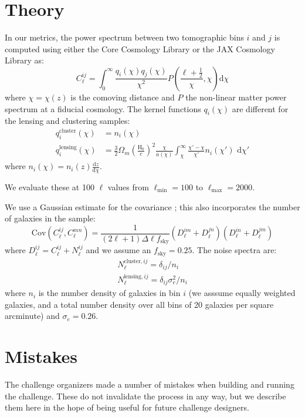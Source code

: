 \documentclass[twocolumn,twocolappendix]{aastex63}
\begin{document}
\section{Theory}\label{app:theory}
In our metrics, the power spectrum between two tomographic bins $i$ and $j$ is computed using either the Core Cosmology Library \citep{ccl} or the JAX Cosmology Library \citep{jax-cosmo} as:
\begin{equation}
    C^{ij}_\ell = \int_0^{\infty} \frac{q_i(\chi) q_j(\chi)}{\chi^2} P\left(\frac{\ell +\frac{1}{2}}{\chi}, \chi \right) \mathrm{d}\chi
\end{equation}
where $\chi = \chi(z)$ is the comoving distance and $P$ the non-linear matter power spectrum at
a fiducial cosmology.  The kernel functions $q_i(\chi)$ are different for the lensing and clustering samples:
\begin{align}
    q^{\mathrm{cluster}}_i(\chi) &= n_i(\chi)\\
    q^{\mathrm{lensing}}_i(\chi) &= \frac{3}{2}\Omega_m \left(\frac{\mathrm{H}_0}{c}\right)^2 \frac{\chi}{a(\chi)} \int_\chi^{\infty} \frac{\chi' - \chi}{\chi'} n_i(\chi')\,\,\mathrm{d}\chi'
\end{align}
where $n_i(\chi) = n_i(z) \frac{\mathrm{d}z}{\mathrm{d}\chi}$.

We evaluate these at 100 $\ell$ values from $\ell_\mathrm{min}=100$ to $\ell_\mathrm{max}=2000$.

We use a Gaussian estimate for the covariance \citep{takada_jain}; this also incorporates the number of galaxies in the
sample:
\begin{equation}
    \mathrm{Cov}(C^{ij}_\ell, C^{mn}_\ell) = \frac{1}{(2 \ell + 1)\Delta\ell f_\mathrm{sky}}(D^{im}_\ell + D^{jn}_\ell)(D^{in}_\ell + D^{jm}_\ell)
\end{equation}
where $D^{ij}_\ell = C^{ij}_\ell + N^{ij}_\ell$ and we assume an $f_\mathrm{sky}=0.25$.  The noise spectra are:
\begin{align}
N^{\mathrm{cluster},ij}_\ell = \delta_{ij} / n_i \\
N^{\mathrm{lensing},ij}_\ell = \delta_{ij} \sigma_e^2 / n_i
\end{align}
where $n_i$ is the number density of galaxies in bin $i$ (we asssume equally weighted galaxies, and a 
total number density over all bins of 20 galaxies per square arcminute) and $\sigma_e=0.26$.

\section{Mistakes}
The challenge organizers made a number of mistakes when building and running the challenge.
These do not invalidate the process in any way, but we describe them here in the hope of
being useful for future challenge designers.
\end{document}
